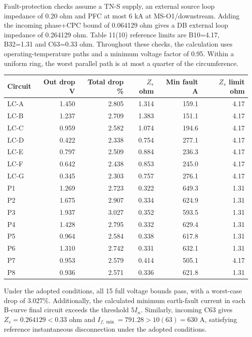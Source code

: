 Fault-protection checks assume a TN-S supply, an external source loop impedance of 0.20 ohm and PFC at most 6 kA at MS-O1/downstream.  Adding the incoming phase+CPC bound of 0.064129 ohm gives a DB external loop impedance of 0.264129 ohm. Table 11(10) reference limits are B10=4.17, B32=1.31 and C63=0.33 ohm. Throughout these checks, the calculation uses operating-temperature paths and a minimum voltage factor of 0.95. Within a uniform ring, the worst parallel path is at most a quarter of the circumference.
\begin{longtable}{lrrrrr}\toprule
Circuit & Out drop V & Total drop \% & $Z_s$ ohm & Min fault A & $Z_s$ limit ohm\\\midrule\endhead

LC-A & 1.450 & 2.805 & 1.314 & 159.1 & 4.17 \\
LC-B & 1.237 & 2.709 & 1.383 & 151.1 & 4.17 \\
LC-C & 0.959 & 2.582 & 1.074 & 194.6 & 4.17 \\
LC-D & 0.422 & 2.338 & 0.754 & 277.1 & 4.17 \\
LC-E & 0.797 & 2.509 & 0.884 & 236.3 & 4.17 \\
LC-F & 0.642 & 2.438 & 0.853 & 245.0 & 4.17 \\
LC-G & 0.345 & 2.303 & 0.757 & 276.1 & 4.17 \\
P1 & 1.269 & 2.723 & 0.322 & 649.3 & 1.31 \\
P2 & 1.675 & 2.907 & 0.334 & 624.9 & 1.31 \\
P3 & 1.937 & 3.027 & 0.352 & 593.5 & 1.31 \\
P4 & 1.428 & 2.795 & 0.332 & 629.4 & 1.31 \\
P5 & 0.964 & 2.584 & 0.338 & 617.8 & 1.31 \\
P6 & 1.310 & 2.742 & 0.331 & 632.1 & 1.31 \\
P7 & 0.953 & 2.579 & 0.414 & 505.1 & 4.17 \\
P8 & 0.936 & 2.571 & 0.336 & 621.8 & 1.31 \\

\bottomrule\end{longtable}
Under the adopted conditions, all 15 full voltage bounds pass, with a worst-case drop of 3.027\%. Additionally, the calculated minimum earth-fault current in each B-curve final circuit exceeds the threshold $5I_n$. Similarly, incoming C63 gives $Z_s=0.264129<0.33$ ohm and $I_{f,\min}=791.28>10(63)=630$ A, satisfying reference instantaneous disconnection under the adopted conditions.
\newpage
